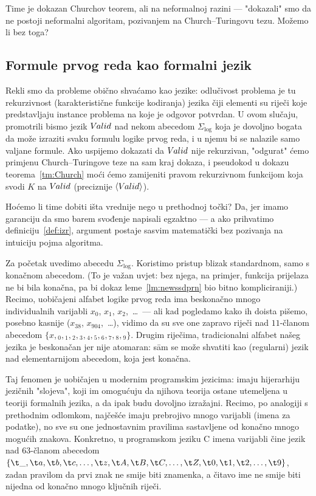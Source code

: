 
Time je dokazan Churchov teorem, ali na neformalnoj razini --- "dokazali" smo da ne postoji neformalni algoritam, pozivanjem na Church--\!Turingovu tezu. Možemo li bez toga?

\subsection{Formule prvog reda kao formalni jezik}

Rekli smo da probleme obično shvaćamo kao jezike: odlučivost problema je tu rekurzivnost (karakteristične funkcije kodiranja) jezika čiji elementi su riječi koje predstavljaju instance problema na koje je odgovor potvrdan. U ovom slučaju, promotrili bismo jezik $V\mspace{-1.5mu}alid$ nad nekom abecedom $\Sigma_{\log}$ koja je dovoljno bogata da može izraziti svaku formulu logike prvog reda, i u njemu bi se nalazile samo valjane formule. Ako uspijemo dokazati da $V\mspace{-1.5mu}alid$ nije rekurzivan, "odgurat" ćemo primjenu Church--\!Turingove teze na sam kraj dokaza, i pseudokod u dokazu teorema~\ref{tm:Church} moći ćemo zamijeniti pravom rekurzivnom funkcijom koja svodi $K$ na $V\mspace{-1.5mu}alid$ (preciznije $\langle V\mspace{-1.5mu}alid\rangle$).

Hoćemo li time dobiti išta vrednije nego u prethodnoj točki? Da, jer imamo garanciju da smo barem svođenje napisali egzaktno --- a ako prihvatimo definiciju~\ref{def:izr}, argument postaje sasvim matematički bez pozivanja na intuiciju pojma algoritma.

Za početak uvedimo abecedu $\Sigma_{\log}$. Koristimo pristup blizak standardnom, samo s konačnom abecedom. (To je važan uvjet: bez njega, na primjer, funkcija prijelaza ne bi bila konačna, pa bi dokaz leme~\ref{lm:newssdprn} bio bitno kompliciraniji.) Recimo, uobičajeni alfabet logike prvog reda ima beskonačno mnogo individualnih varijabli $x_0$, $x_1$, $x_2$,~\ldots\ --- ali kad pogledamo kako ih doista pišemo, posebno kasnije ($x_{38}$, $x_{904}$,~\ldots), vidimo da su sve one zapravo riječi nad $11$-članom abecedom $\{x,{}_0,{}_1,{}_2,{}_3,{}_4,{}_5,{}_6,{}_7,{}_8,{}_9\}$. Drugim riječima, tradicionalni alfabet našeg jezika je beskonačan jer nije atomaran: s\=am se može shvatiti kao (regularni) jezik nad elementarnijom abecedom, koja jest konačna.

Taj fenomen je uobičajen u modernim programskim jezicima: imaju hijerarhiju jezičnih "slojeva", koji im omogućuju da njihova teorija ostane utemeljena u teoriji formalnih jezika, a da ipak budu dovoljno izražajni. Recimo, po analogiji s prethodnim odlomkom, najčešće imaju prebrojivo mnogo varijabli (imena za podatke), no sve su one jednostavnim pravilima sastavljene od konačno mnogo mogućih znakova. Konkretno, u programskom jeziku C imena varijabli čine jezik nad $63$-članom abecedom $\{\t\_,\t a,\t b,\t c,\dotsc,\t z,\t A,\t B,\t C,\dotsc,\t Z,\t 0,\t 1,\t 2,\dotsc,\t 9\}$, zadan pravilom da prvi znak ne smije biti znamenka, a čitavo ime ne smije biti nijedna od konačno mnogo ključnih riječi.

